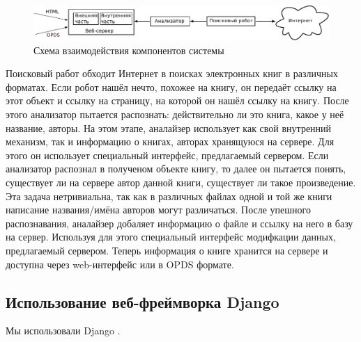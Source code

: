 \begin{figure}
\centering
\includegraphics[width=.9\textwidth]{./head/innerstructure}
\caption{Схема взаимодействия компонентов системы}\label{fig:innerstructure}
\end{figure}

Поисковый работ обходит Интернет в поисках электронных книг в различных форматах. Если робот нашёл нечто, похожее на книгу, он передаёт ссылку на этот объект и ссылку на страницу, на которой он нашёл ссылку на книгу.
После этого анализатор пытается распознать: действительно ли это книга, какое у неё название, авторы. На этом этапе, аналайзер использует как свой внутренний механизм, так и информацию о книгах, авторах хранящуюся на сервере. Для этого он использует специальный интерфейс, предлагаемый сервером.
Если анализатор распознал в полученом объекте книгу, то далее он пытается понять, существует ли на сервере автор данной книги, существует ли такое произведение. Эта задача нетривиальна, так как в различных файлах одной и той же книги написание названия/имёна авторов могут различаться.
После упешного распознавания, аналайзер добаляет информацию о файле и ссылку на него в базу на сервер. Используя для этого специальный интерфейс модифкации данных, предлагаемый сервером.
Теперь информация о книге хранится на сервере и доступна через web-интерфейс или в OPDS формате.



\subsection{Использование веб-фреймворка Django}
Мы использовали Django \cite{django}.


